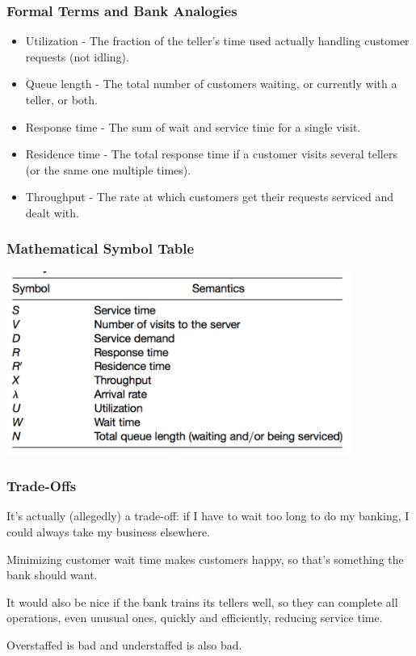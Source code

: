 \begin{frame}
\frametitle{Formal Terms and Bank Analogies}

\begin{itemize}
	\item Utilization - The fraction of the teller's time used actually handling customer requests (not idling).
	\item Queue length - The total number of customers waiting, or currently with a teller, or both.
	\item Response time - The sum of wait and service time for a single visit.
	\item Residence time - The total response time if a customer visits several tellers (or the same one multiple times).
	\item Throughput - The rate at which customers get their requests serviced and dealt with.
\end{itemize}

\end{frame}



\begin{frame}
\frametitle{Mathematical Symbol Table}

\begin{center}
	\includegraphics[width=0.85\textwidth]{images/math-symbols.png}
\end{center}

\end{frame}



\begin{frame}
\frametitle{Trade-Offs}

It's actually (allegedly) a trade-off: if I have to wait too long to do my banking, I could always take my business elsewhere. 

Minimizing customer wait time makes customers happy, so that's something the bank should want. 

It would also be nice if the bank trains its tellers well, so they can complete all operations, even unusual ones, quickly and efficiently, reducing service time.

Overstaffed is bad and understaffed is also bad. 

\end{frame}


